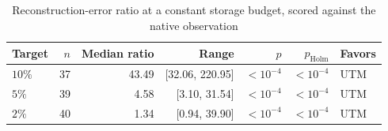 \begin{table}[t]
\centering
\caption{Reconstruction-error ratio at a constant storage budget, scored against the native observation}
\label{tab:error_at_size_common}
\footnotesize
\setlength{\tabcolsep}{3pt}
\begin{tabular}{lrrrrrl}
\toprule
Target & $n$ & Median ratio & Range & $p$ & $p_{\mathrm{Holm}}$ & Favors \\
\midrule
$10\%$ & 37 & 43.49 & [32.06, 220.95] & $<10^{-4}$ & $<10^{-4}$ & UTM \\
$5\%$ & 39 & 4.58 & [3.10, 31.54] & $<10^{-4}$ & $<10^{-4}$ & UTM \\
$2\%$ & 40 & 1.34 & [0.94, 39.90] & $<10^{-4}$ & $<10^{-4}$ & UTM \\
\bottomrule
\end{tabular}
\end{table}
